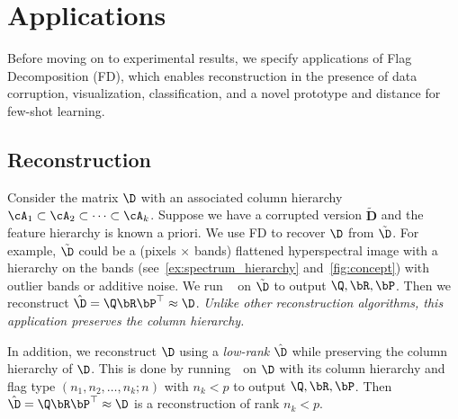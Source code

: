 \section{Applications}\label{sec:apps}
Before moving on to experimental results, we specify applications of Flag Decomposition (FD), which enables reconstruction in the presence of data corruption, visualization, classification, and a novel prototype and distance for few-shot learning. 

\subsection{Reconstruction}
Consider the matrix $\D$ with an associated column hierarchy $\cA_1 \subset \cA_2 \subset \cdots\subset  \cA_k$. Suppose we have a corrupted version $\tilde{\mathbf{D}}$ and the feature hierarchy is known a priori. We use FD to recover $\D$ from $\tilde{\D}$. For example, $\tilde{\D}$ could be a (pixels $\times$ bands) flattened hyperspectral image with a hierarchy on the bands (see~\cref{ex:spectrum_hierarchy} and~\cref{fig:concept}) with outlier bands or additive noise. We run \algname~ on $\tilde{\D}$ to output $\Q, \bR, \bP$. Then we reconstruct $\hat{\D} = \Q \bR \bP^\top \approx \D$. \emph{Unlike other reconstruction algorithms, this application preserves the column hierarchy.}

In addition, we reconstruct $\D$ using a \emph{low-rank} $\hat{\D}$ while preserving the column hierarchy of $\D$. This is done by running~\algname~on $\D$ with its column hierarchy and flag type $(n_1,n_2,\dots,n_k;n)$ with $n_k < p$ to output $\Q, \bR, \bP$. Then $\hat{\D} = \Q \bR \bP^\top \approx \D$ is a reconstruction of rank $n_k < p$.




